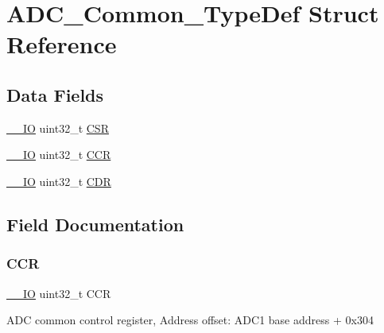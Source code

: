 \hypertarget{struct_a_d_c___common___type_def}{}\section{A\+D\+C\+\_\+\+Common\+\_\+\+Type\+Def Struct Reference}
\label{struct_a_d_c___common___type_def}
\subsection*{Data Fields}
\begin{DoxyCompactItemize}
\item 
\mbox{\hyperlink{core__sc300_8h_aec43007d9998a0a0e01faede4133d6be}{\+\_\+\+\_\+\+IO}} uint32\+\_\+t \mbox{\hyperlink{struct_a_d_c___common___type_def_a876dd0a8546697065f406b7543e27af2}{C\+SR}}
\item 
\mbox{\hyperlink{core__sc300_8h_aec43007d9998a0a0e01faede4133d6be}{\+\_\+\+\_\+\+IO}} uint32\+\_\+t \mbox{\hyperlink{struct_a_d_c___common___type_def_a5e1322e27c40bf91d172f9673f205c97}{C\+CR}}
\item 
\mbox{\hyperlink{core__sc300_8h_aec43007d9998a0a0e01faede4133d6be}{\+\_\+\+\_\+\+IO}} uint32\+\_\+t \mbox{\hyperlink{struct_a_d_c___common___type_def_a760f86a1a18dffffda54fc15a977979f}{C\+DR}}
\end{DoxyCompactItemize}


\subsection{Field Documentation}
\mbox{\label{struct_a_d_c___common___type_def_a5e1322e27c40bf91d172f9673f205c97}} 
\subsubsection{\texorpdfstring{C\+CR}{CCR}}
{\footnotesize\ttfamily \mbox{\hyperlink{core__sc300_8h_aec43007d9998a0a0e01faede4133d6be}{\+\_\+\+\_\+\+IO}} uint32\+\_\+t C\+CR}

A\+DC common control register, Address offset\+: A\+D\+C1 base address + 0x304 \mbox{\label{struct_a_d_c___common___type_def_a760f86a1a18dffffda54fc15a977979f}} 
